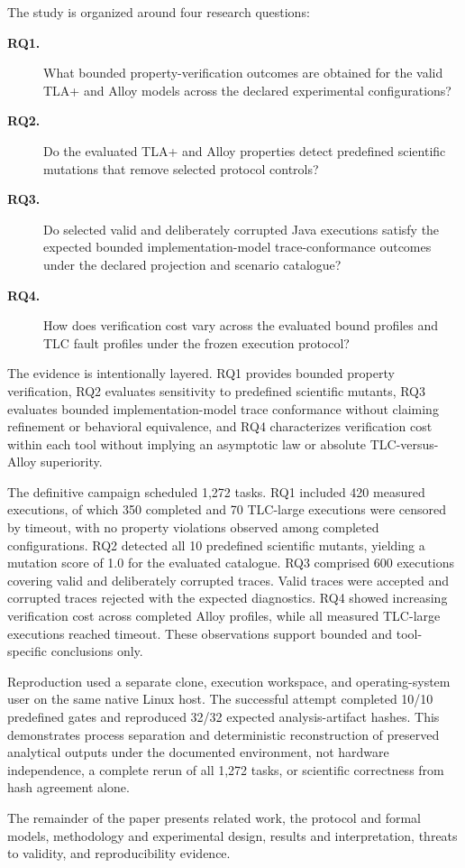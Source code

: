 The study is organized around four research questions:

\begin{description}
\item[\textbf{RQ1.}] What bounded property-verification outcomes are obtained
for the valid TLA+ and Alloy models across the declared experimental
configurations?

\item[\textbf{RQ2.}] Do the evaluated TLA+ and Alloy properties detect
predefined scientific mutations that remove selected protocol controls?

\item[\textbf{RQ3.}] Do selected valid and deliberately corrupted Java
executions satisfy the expected bounded implementation-model trace-conformance
outcomes under the declared projection and scenario catalogue?

\item[\textbf{RQ4.}] How does verification cost vary across the evaluated
bound profiles and TLC fault profiles under the frozen execution protocol?
\end{description}

The evidence is intentionally layered. RQ1 provides bounded property
verification, RQ2 evaluates sensitivity to predefined scientific mutants, RQ3
evaluates bounded implementation-model trace conformance without claiming
refinement or behavioral equivalence, and RQ4 characterizes verification cost
within each tool without implying an asymptotic law or absolute
TLC-versus-Alloy superiority.

The definitive campaign scheduled 1,272 tasks. RQ1 included 420 measured
executions, of which 350 completed and 70 TLC-large executions were censored by
timeout, with no property violations observed among completed configurations.
RQ2 detected all 10 predefined scientific mutants, yielding a mutation score of
1.0 for the evaluated catalogue. RQ3 comprised 600 executions covering valid
and deliberately corrupted traces. Valid traces were accepted and corrupted
traces rejected with the expected diagnostics. RQ4 showed increasing
verification cost across completed Alloy profiles, while all measured
TLC-large executions reached timeout. These observations support bounded and
tool-specific conclusions only.

Reproduction used a separate clone, execution workspace, and operating-system
user on the same native Linux host. The successful attempt completed 10/10
predefined gates and reproduced 32/32 expected analysis-artifact hashes. This
demonstrates process separation and deterministic reconstruction of preserved
analytical outputs under the documented environment, not hardware independence,
a complete rerun of all 1,272 tasks, or scientific correctness from hash
agreement alone.

The remainder of the paper presents related work, the protocol and formal
models, methodology and experimental design, results and interpretation,
threats to validity, and reproducibility evidence.

